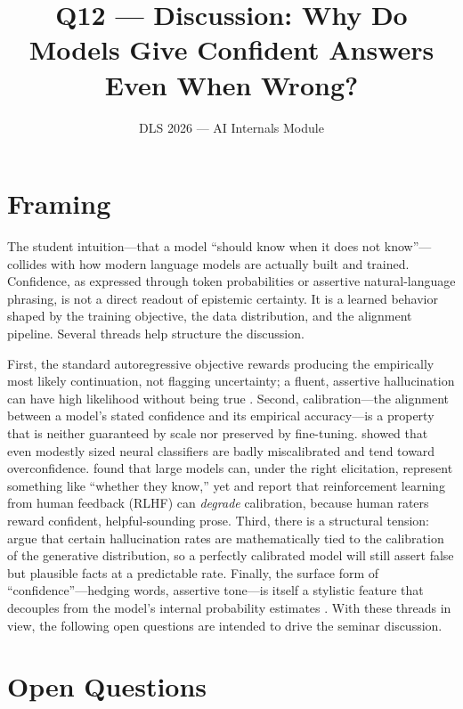 \documentclass[11pt]{article}
\title{Q12 --- Discussion: Why Do Models Give Confident Answers Even When Wrong?}
\author{DLS 2026 --- AI Internals Module}
\date{}
\begin{document}
\maketitle

\section*{Framing}

The student intuition---that a model ``should know when it does not know''---collides with how modern language models are actually built and trained. Confidence, as expressed through token probabilities or assertive natural-language phrasing, is not a direct readout of epistemic certainty. It is a learned behavior shaped by the training objective, the data distribution, and the alignment pipeline. Several threads help structure the discussion.

First, the standard autoregressive objective rewards producing the empirically most likely continuation, not flagging uncertainty; a fluent, assertive hallucination can have high likelihood without being true \citep{ji2023survey}. Second, calibration---the alignment between a model's stated confidence and its empirical accuracy---is a property that is neither guaranteed by scale nor preserved by fine-tuning. \citet{guo2017calibration} showed that even modestly sized neural classifiers are badly miscalibrated and tend toward overconfidence. \citet{kadavath2022know} found that large models can, under the right elicitation, represent something like ``whether they know,'' yet \citet{openai2023gpt4} and \citet{ouyang2022instructgpt} report that reinforcement learning from human feedback (RLHF) can \emph{degrade} calibration, because human raters reward confident, helpful-sounding prose. Third, there is a structural tension: \citet{kalai2024calibrated} argue that certain hallucination rates are mathematically tied to the calibration of the generative distribution, so a perfectly calibrated model will still assert false but plausible facts at a predictable rate. Finally, the surface form of ``confidence''---hedging words, assertive tone---is itself a stylistic feature that decouples from the model's internal probability estimates \citep{zhou2024relying,lin2022teaching}. With these threads in view, the following open questions are intended to drive the seminar discussion.

\section*{Open Questions}
\end{document}
